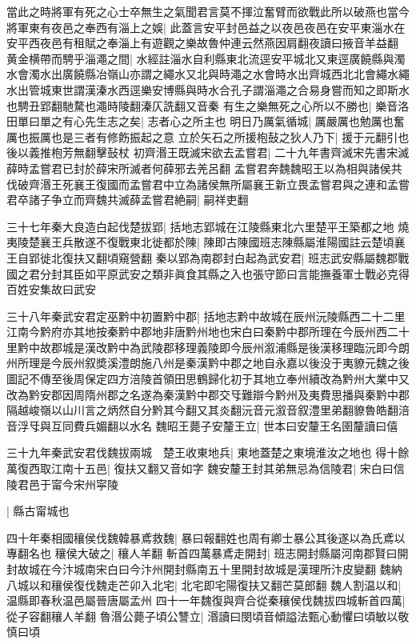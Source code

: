 當此之時將軍有死之心士卒無生之氣聞君言莫不揮泣奮臂而欲戰此所以破燕也當今將軍東有夜邑之奉西有淄上之娛|{
	此蓋言安平封邑益之以夜邑夜邑在安平東淄水在安平西夜邑有租賦之奉淄上有遊觀之樂故魯仲連云然燕因肩翻夜讀曰掖音羊益翻}
黄金横帶而騁乎淄澠之間|{
	水經註淄水自利縣東北流逕安平城北又東逕廣饒縣與濁水會濁水出廣饒縣冶嶺山亦謂之繩水又北與時澠之水會時水出齊城西北北會繩水繩水出管城東世謂漢溱水西逕樂安博縣與時水合孔子謂淄澠之合易身嘗而知之即斯水也騁丑郢翻馳騖也澠時陵翻溱仄詵翻又音秦}
有生之樂無死之心所以不勝也|{
	樂音洛}
田單曰單之有心先生志之矣|{
	志者心之所主也}
明日乃厲氣循城|{
	厲嚴厲也勉厲也奮厲也振厲也是三者有修飭振起之意}
立於矢石之所援枹鼔之狄人乃下|{
	援于元翻引也後以義推枹芳無翻擊鼔杖}
初齊湣王既滅宋欲去孟嘗君|{
	二十九年書齊滅宋先書宋滅薛時孟嘗君已封於薛宋所滅者何薛邪去羌呂翻}
孟嘗君奔魏魏昭王以為相與諸侯共伐破齊湣王死襄王復國而孟嘗君中立為諸侯無所屬襄王新立畏孟嘗君與之連和孟嘗君卒諸子争立而齊魏共滅薛孟嘗君絶嗣|{
	嗣祥吏翻}


三十七年秦大良造白起伐楚拔郢|{
	括地志郢城在江陵縣東北六里楚平王築都之地}
燒夷陵楚襄王兵散遂不復戰東北徙都於陳|{
	陳即古陳國班志陳縣屬淮陽國註云楚頃襄王自郢徙北復扶又翻頃窺營翻}
秦以郢為南郡封白起為武安君|{
	班志武安縣屬魏郡戰國之君分封其臣如平原武安之類非眞食其縣之入也張守節曰言能撫養軍士戰必克得百姓安集故曰武安}


三十八年秦武安君定巫黔中初置黔中郡|{
	括地志黔中故城在辰州沅陵縣西二十二里江南今黔府亦其地按秦黔中郡地非唐黔州地也宋白曰秦黔中郡所理在今辰州西二十里黔中故郡城是漢改黔中為武陵郡移理義陵即今辰州溆浦縣是後漢移理臨沅即今朗州所理是今辰州叙奬溪澧朗施八州是秦漢黔中郡之地自永嘉以後没于夷䝤元魏之後圖記不傳至後周保定四方涪陵首領田思鶴歸化初于其地立奉州續改為黔州大業中又改為黔安郡因周隋州郡之名遂為秦漢黔中郡交㸦難辯今黔州及夷費思播與秦黔中郡隔越峻嶺以山川言之炳然自分黔其今翻又其炎翻沅音元溆音叙澧里弟翻䝤魯皓翻涪音浮㸦與互同費兵媚翻以水名}
魏昭王薨子安釐王立|{
	世本曰安釐王名圉釐讀曰僖}


三十九年秦武安君伐魏拔兩城　楚王收東地兵|{
	東地蓋楚之東境淮汝之地也}
得十餘萬復西取江南十五邑|{
	復扶又翻又音如字}
魏安釐王封其弟無忌為信陵君|{
	宋白曰信陵君邑于甯今宋州寜陵}


|{
	縣古甯城也}


四十年秦相國穰侯伐魏韓暴鳶救魏|{
	暴曰報翻姓也周有卿士暴公其後遂以為氏鳶以專翻名也}
穰侯大破之|{
	穰人羊翻}
斬首四萬暴鳶走開封|{
	班志開封縣屬河南郡賢曰開封故城在今汴城南宋白曰今汴州開封縣南五十里開封故城是漢理所汴皮變翻}
魏納八城以和穰侯復伐魏走芒卯入北宅|{
	北宅即宅陽復扶又翻芒莫郎翻}
魏人割温以和|{
	温縣即春秋温邑屬晉唐屬孟州}
四十一年魏復與齊合從秦穰侯伐魏拔四城斬首四萬|{
	從子容翻穰人羊翻}
魯湣公薨子頃公讐立|{
	湣讀曰閔頃音傾謚法甄心動懼曰頃敏以敬慎曰頃}


